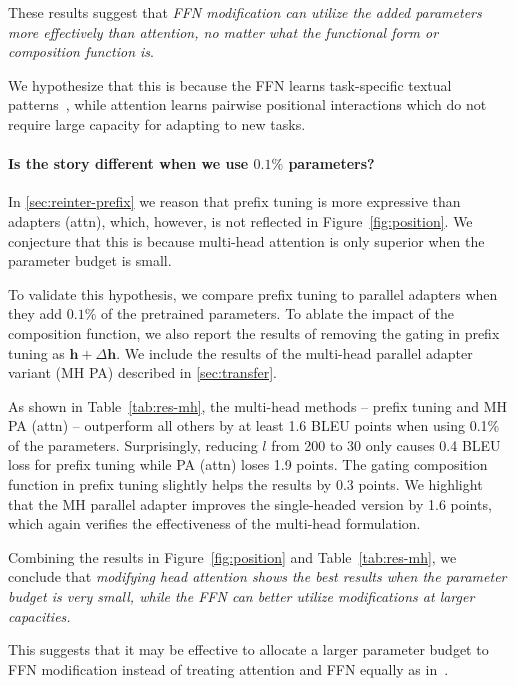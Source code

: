 These results suggest that \emph{FFN modification can utilize the added parameters more effectively than attention, no matter what the functional form or composition function is}.

We hypothesize that this is because the FFN learns task-specific textual patterns~\citep{geva2020transformer}, while attention learns pairwise positional interactions which do not require large capacity for adapting to new tasks. 

\paragraph{Is the story different when we use $0.1\%$ parameters?} In \textsection\ref{sec:reinter-prefix} we reason that prefix tuning is more expressive than adapters (attn), which, however, is not reflected in  Figure~\ref{fig:position}.
We conjecture that this is because multi-head attention is only superior when the parameter budget is small.

To validate this hypothesis, we compare prefix tuning to parallel adapters when they add $0.1\%$ of the pretrained parameters. To ablate the impact of the composition function, we also report the results of removing the gating in prefix tuning as ${\bm{h}} + \Delta {\bm{h}}$. We include the results of the multi-head parallel adapter variant (MH PA) described in \textsection\ref{sec:transfer}. 

As shown in Table~\ref{tab:res-mh}, the multi-head methods -- prefix tuning and MH PA (attn) -- outperform all others by at least 1.6 BLEU points when using 0.1\% of the parameters. Surprisingly, reducing $l$ from 200 to 30 only causes 0.4 BLEU loss for prefix tuning while PA (attn) loses 1.9 points. The gating composition function in prefix tuning slightly helps the results by 0.3 points. We highlight that the MH parallel adapter improves the single-headed version by 1.6 points, which again verifies the effectiveness of the multi-head formulation.

Combining the results in Figure~\ref{fig:position} and Table~\ref{tab:res-mh}, we conclude that \emph{modifying head attention shows the best results when the parameter budget is very small, while the FFN can better utilize modifications at larger capacities.} 

This suggests that it may be effective to allocate a larger parameter budget to FFN modification instead of treating attention and FFN equally as in~\citet{houlsby2019parameter}.


